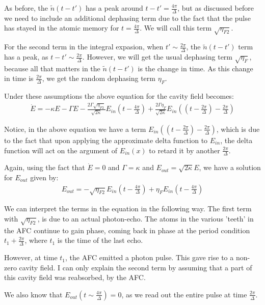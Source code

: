 \documentclass[12pt]{article}
\begin{document}
As before, the $\tilde{n}(t-t')$ has a peak around $t-t' = \frac{4 \pi}{\Delta}$, but as discussed before
we need to include an additional dephasing term due to the fact that the pulse has stayed in the atomic memory for $t = \frac{4 \pi}{\Delta}$. We will call this term $\sqrt{ \eta_{F2}}$.

For the second term in the integral expasion, when $t'\sim \frac{2 \pi}{\Delta}$, the $\tilde{n}(t-t')$ term has a peak, as $t -t' \sim \frac{ 2 \pi}{\Delta}$. However, we will get the usual dephasing term $\sqrt{\eta_{F}}$, because all that matters in the $\tilde{n}(t-t')$ is the change in time. As this change in time is $\frac{2 \pi}{\Delta}$, we get the random dephasing term $\eta_{F}$.

Under these assumptions the above equation for the cavity field becomes:
\begin{align}
\dot{E} = -\kappa E -\Gamma E - \frac{2 \Gamma \sqrt{\eta_{F2}}}{\sqrt{2 \kappa}} E_{in}(t-\frac{4 \pi}{\Delta})+\frac{2 \Gamma \eta_{F}}{\sqrt{2 \kappa}} E_{in}\left((t-\frac{2 \pi}{\Delta})-\frac{2 \pi}{\Delta}\right)
\end{align}

Notice, in the above equation we have a term $E_{in}\left( (t -\frac{2 \pi}{\Delta}) - \frac{2 \pi}{\Delta}\right)$, which is due to the fact that upon applying the approximate delta function to $E_{in}$, the delta function will act on the argument of $E_{in}(x)$ to retard it by another $\frac{2 \pi}{\Delta}$.


Again, using the fact that $\dot{E}=0$ and $\Gamma= \kappa$ and $E_{out} = \sqrt{2 \kappa} E$, we have a
solution for $E_{out}$ given by:
\begin{align}
E_{out} = -\sqrt{\eta_{F2}}E_{in}(t-\frac{4 \pi}{\Delta}) + \eta_{F} E_{in}(t- \frac{ 4 \pi}{\Delta})
\end{align}

We can interpret the terms in the equation in the following way. The first term with $\sqrt{\eta_{F2}}$, is
due to an actual photon-echo. The atoms in the various 'teeth' in the AFC continue to gain phase, coming back in phase at the period condition $t_1+\frac{2 \pi}{\Delta}$, where $t_1$ is the time of the last echo.

However, at time $t_1$, the AFC emitted a photon pulse. This gave rise to a non-zero cavity field. I can
only explain the second term by assuming that a part of this cavity field was reabsorbed, by the AFC.

We also know that $E_{out}(t\sim \frac{4 \pi}{\Delta})=0$, as we read out the entire pulse at time $\frac{2 \pi}{\Delta}$.
\end{document}

